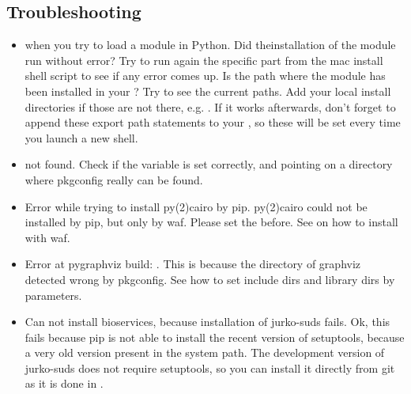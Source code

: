 \documentclass[letterpaper,10pt,english]{sphinxmanual}
\begin{document}
\subsection{Troubleshooting}
\label{\detokenize{installation:troubleshooting}}\begin{itemize}
\item {} 
 when you try to load a module in Python. Did
theinstallation of the module run without error? Try to run again the specific
part from the mac install shell script to see if any error comes up. Is the
path where the module has been installed in your ? Try  to see the current paths. Add your local install directories if
those are not there, e.g.
.
If it works afterwards, don’t forget to append these export path statements to
your , so these will be set every time you launch a new
shell.

\item {} 
 not found. Check if the  variable is
set correctly, and pointing on a directory where pkgconfig really can be
found.

\item {} 
Error while trying to install py(2)cairo by pip. py(2)cairo could not be
installed by pip, but only by waf. Please set the  before.
See  on how to install with waf.

\item {} 
Error at pygraphviz build: . This is
because the directory of graphviz detected wrong by pkgconfig. See
 how to set include dirs and library dirs by
 parameters.

\item {} 
Can not install bioservices, because installation of jurko-suds fails. Ok,
this fails because pip is not able to install the recent version of
setuptools, because a very old version present in the system path. The
development version of jurko-suds does not require setuptools, so you can
install it directly from git as it is done in .


\end{itemize}
\end{document}

